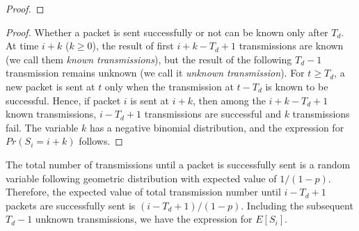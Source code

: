 \begin{proof}
    \QED
    \end{proof}
\else
    
    \begin{proof}
    Whether a packet is sent successfully or not can be known only after $T_{d}$.  
    At time $i + k$ ($k \geq 0$),  the result of first $i + k - T_d + 1$ transmissions are
    known (we call them \textit{known transmissions}), but the result of the following $T_d - 1$
    transmission remains unknown (we call it \textit{unknown transmission}).  For $t \geq T_d$,
    a new packet is sent at $t$ only when the
    transmission at $t-T_d$ is known to be successful.  Hence, if packet $i$ is sent at
    $i+k$, then among the $i + k - T_d + 1$ known transmissions, $i - T_d + 1$
    transmissions are successful and $k$ transmissions fail.
    The variable $k$ has a negative binomial distribution,
    and the expression for $Pr(S_i = i+k)$ follows.
    \QED
    \end{proof}

    The total number of transmissions until a packet is successfully sent is
    a random variable following geometric distribution with expected value of
    $1/(1-p)$. Therefore, the expected value of total transmission number
    until $i - T_d + 1$ packets are successfully sent is $(i-T_d+1)/(1-p)$.
    Including the subsequent $T_d - 1$ unknown transmissions, we have the expression
    for $E[S_i]$. 
\fi

